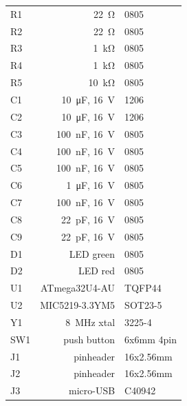%
\begin{xtabular*}{\columnwidth}{lrl}
  R1 & \SI{22}{\ohm} & 0805 \\
  R2 & \SI{22}{\ohm} & 0805 \\
  R3 & \SI{1}{\kilo\ohm} & 0805 \\
  R4 & \SI{1}{\kilo\ohm} & 0805 \\
  R5 & \SI{10}{\kilo\ohm} & 0805 \\
  \hline
  C1 & \SI{10}{\micro\farad}, \SI{16}{\volt} & 1206 \\
  C2 & \SI{10}{\micro\farad}, \SI{16}{\volt} & 1206 \\
  C3 & \SI{100}{\nano\farad}, \SI{16}{\volt} & 0805 \\
  C4 & \SI{100}{\nano\farad}, \SI{16}{\volt} & 0805 \\
  C5 & \SI{100}{\nano\farad}, \SI{16}{\volt} & 0805 \\
  C6 & \SI{1}{\micro\farad}, \SI{16}{\volt} & 0805 \\
  C7 & \SI{100}{\nano\farad}, \SI{16}{\volt} & 0805 \\
  C8 & \SI{22}{\pico\farad}, \SI{16}{\volt} & 0805 \\
  C9 & \SI{22}{\pico\farad}, \SI{16}{\volt} & 0805 \\
  \hline
  D1 & LED green & 0805 \\
  D2 & LED red & 0805 \\
  \hline
  U1 & ATmega32U4-AU & TQFP44\\
  U2 & MIC5219-3.3YM5 & SOT23-5\\
  \hline
  Y1 & \SI{8}{\mega\hertz} xtal & 3225-4\\
  \hline
  SW1 & push button & 6x6mm 4pin\\
  J1 & pinheader & 16x2.56mm\\
  J2 & pinheader & 16x2.56mm\\
  J3 & micro-USB & C40942\\
\end{xtabular*}

